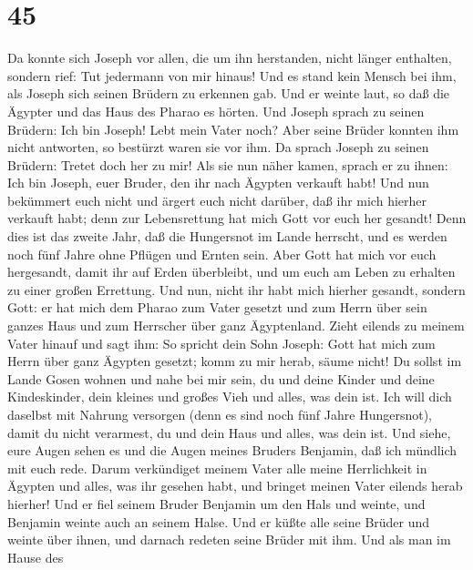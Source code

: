 \hypertarget{section-44}{%
\section{45}\label{section-44}}

 Da konnte sich Joseph vor allen, die um ihn herstanden,
nicht länger enthalten, sondern rief: Tut jedermann von mir hinaus! Und
es stand kein Mensch bei ihm, als Joseph sich seinen Brüdern zu erkennen
gab.  Und er weinte laut, so daß die Ägypter und das Haus
des Pharao es hörten.  Und Joseph sprach zu seinen
Brüdern: Ich bin Joseph! Lebt mein Vater noch? Aber seine Brüder konnten
ihm nicht antworten, so bestürzt waren sie vor ihm.  Da
sprach Joseph zu seinen Brüdern: Tretet doch her zu mir! Als sie nun
näher kamen, sprach er zu ihnen: Ich bin Joseph, euer Bruder, den ihr
nach Ägypten verkauft habt!  Und nun bekümmert euch nicht
und ärgert euch nicht darüber, daß ihr mich hierher verkauft habt; denn
zur Lebensrettung hat mich Gott vor euch her gesandt! 
Denn dies ist das zweite Jahr, daß die Hungersnot im Lande herrscht, und
es werden noch fünf Jahre ohne Pflügen und Ernten sein. 
Aber Gott hat mich vor euch hergesandt, damit ihr auf Erden überbleibt,
und um euch am Leben zu erhalten zu einer großen Errettung.
 Und nun, nicht ihr habt mich hierher gesandt, sondern
Gott: er hat mich dem Pharao zum Vater gesetzt und zum Herrn über sein
ganzes Haus und zum Herrscher über ganz Ägyptenland. 
Zieht eilends zu meinem Vater hinauf und sagt ihm: So spricht dein Sohn
Joseph: Gott hat mich zum Herrn über ganz Ägypten gesetzt; komm zu mir
herab, säume nicht!  Du sollst im Lande Gosen wohnen und
nahe bei mir sein, du und deine Kinder und deine Kindeskinder, dein
kleines und großes Vieh und alles, was dein ist.  Ich
will dich daselbst mit Nahrung versorgen (denn es sind noch fünf Jahre
Hungersnot), damit du nicht verarmest, du und dein Haus und alles, was
dein ist.  Und siehe, eure Augen sehen es und die Augen
meines Bruders Benjamin, daß ich mündlich mit euch rede. 
Darum verkündiget meinem Vater alle meine Herrlichkeit in Ägypten und
alles, was ihr gesehen habt, und bringet meinen Vater eilends herab
hierher!  Und er fiel seinem Bruder Benjamin um den Hals
und weinte, und Benjamin weinte auch an seinem Halse. 
Und er küßte alle seine Brüder und weinte über ihnen, und darnach
redeten seine Brüder mit ihm.  Und als man im Hause des
